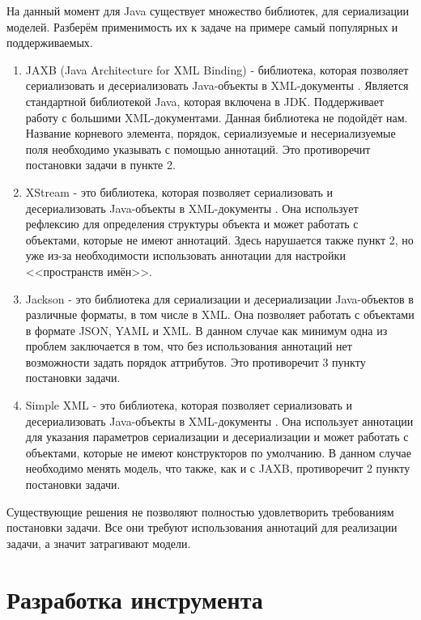 \documentclass[a4paper,12pt]{diplom}
\begin{document}
На данный момент для Java существует множество библиотек, для сериализации моделей. Разберём применимость их к задаче на примере самый популярных и поддерживаемых.

\begin{enumerate}[label=\arabic{enumi})]
	\item JAXB (Java Architecture for XML Binding) - библиотека, которая позволяет сериализовать и десериализовать Java-объекты в XML-документы \cite{Java:JAXP}. Является стандартной библиотекой Java, которая включена в JDK. Поддерживает работу с большими XML-документами. Данная библиотека не подойдёт нам. Название корневого элемента, порядок, сериализуемые и несериализуемые поля необходимо указывать с помощью аннотаций. Это противоречит постановки задачи в пункте 2.
 
    \item  XStream - это библиотека, которая позволяет сериализовать и десериализовать Java-объекты в XML-документы \cite{Str:XStream}. Она использует рефлексию для определения структуры объекта и может работать с объектами, которые не имеют аннотаций. Здесь нарушается также пункт 2, но уже из-за необходимости использовать аннотации для настройки <<пространств имён>>.

    \item  Jackson - это библиотека для сериализации и десериализации Java-объектов в различные форматы, в том числе в XML. Она позволяет работать с объектами в формате JSON, YAML и XML. В данном случае как минимум одна из проблем заключается в том, что без использования аннотаций нет возможности задать порядок аттрибутов. Это противоречит 3 пункту постановки задачи.

    \item  Simple XML - это библиотека, которая позволяет сериализовать и десериализовать Java-объекты в XML-документы \cite{Str:SimpleXML}. Она использует аннотации для указания параметров сериализации и десериализации и может работать с объектами, которые не имеют конструкторов по умолчанию. В данном случае необходимо менять модель, что также, как и с JAXB, противоречит 2 пункту постановки задачи.
\end{enumerate}

Существующие решения не позволяют полностью удовлетворить требованиям постановки задачи. Все они требуют использования аннотаций для реализации задачи, а значит затрагивают модели.

\chapter{Разработка инструмента}
\end{document}

